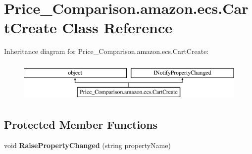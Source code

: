 \hypertarget{class_price___comparison_1_1amazon_1_1ecs_1_1_cart_create}{\section{Price\-\_\-\-Comparison.\-amazon.\-ecs.\-Cart\-Create Class Reference}
\label{class_price___comparison_1_1amazon_1_1ecs_1_1_cart_create}
}


 


Inheritance diagram for Price\-\_\-\-Comparison.\-amazon.\-ecs.\-Cart\-Create\-:\begin{figure}[H]
\begin{center}
\leavevmode
\includegraphics[height=2.000000cm]{class_price___comparison_1_1amazon_1_1ecs_1_1_cart_create}
\end{center}
\end{figure}
\subsection*{Protected Member Functions}
\begin{DoxyCompactItemize}
\item 
\hypertarget{class_price___comparison_1_1amazon_1_1ecs_1_1_cart_create_a0f44a42217fa64fe11c77da6a83a97e3}{void {\bfseries Raise\-Property\-Changed} (string property\-Name)}\label{class_price___comparison_1_1amazon_1_1ecs_1_1_cart_create_a0f44a42217fa64fe11c77da6a83a97e3}

\end{DoxyCompactItemize}
